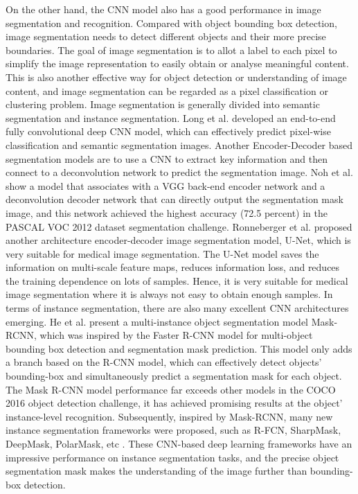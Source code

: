 \documentclass[10pt, a4paper]{IEEEtran} %
\begin{document}
	On the other hand, the CNN model also has a good performance in image segmentation and recognition. Compared with object bounding box detection, image segmentation needs to detect different objects and their more precise boundaries. The goal of image segmentation is to allot a label to each pixel to simplify the image representation to easily obtain or analyse meaningful content. This is also another effective way for object detection or understanding of image content, and image segmentation can be regarded as a pixel classification or clustering problem. Image segmentation is generally divided into semantic segmentation and instance segmentation. Long et al. \cite{long2015fully}  developed an end-to-end fully convolutional deep CNN model, which can effectively predict pixel-wise classification and semantic segmentation images. Another Encoder-Decoder based segmentation models are to use a CNN to extract key information and then connect to a deconvolution network to predict the segmentation image. Noh et al. \cite{noh2015learning} show a model that associates with a VGG back-end encoder network and a deconvolution decoder network that can directly output the segmentation mask image, and this network achieved the highest accuracy (72.5 percent) in the PASCAL VOC 2012 dataset segmentation challenge. Ronneberger et al. \cite{ronneberger2015u} proposed another architecture encoder-decoder image segmentation model, U-Net, which is very suitable for medical image segmentation. The U-Net model saves the information on multi-scale feature maps, reduces information loss, and reduces the training dependence on lots of samples. Hence, it is very suitable for medical image segmentation where it is always not easy to obtain enough samples. In terms of instance segmentation, there are also many excellent CNN architectures emerging. He et al. \cite{he2017mask} present a multi-instance object segmentation model Mask-RCNN, which was inspired by the Faster R-CNN model for multi-object bounding box detection and segmentation mask prediction. This model only adds a branch based on the R-CNN model, which can effectively detect objects’ bounding-box and simultaneously predict a segmentation mask for each object. The Mask R-CNN model performance far exceeds other models in the COCO 2016 object detection challenge, it has achieved promising results at the object’ instance-level recognition. Subsequently, inspired by Mask-RCNN, many new instance segmentation frameworks were proposed, such as R-FCN, SharpMask, DeepMask, PolarMask, etc \cite{minaee2020image}. These CNN-based deep learning frameworks have an impressive performance on instance segmentation tasks, and the precise object segmentation mask makes the understanding of the image further than bounding-box detection.
\end{document}
